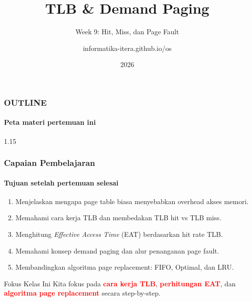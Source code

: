 \documentclass[t,aspectratio=169,xcolor=dvipsnames]{beamer}
\title[TLB \& Demand Paging]{TLB \& Demand Paging}
\subtitle{Week 9: Hit, Miss, dan Page Fault}
\author[informatika-itera.github.io/os]{informatika-itera.github.io/os}
\institute[ITERA]{Program Studi Teknik Informatika \\ Institut Teknologi Sumatera}
\date{\textcolor{nyublue}{2026}}
\newcommand{\tem}[1]{\textbf{\textcolor{red}{#1}}}
\begin{document}
\begin{frame}
    \titlepage
\end{frame}

\begin{frame}
    \frametitle{OUTLINE}
    \framesubtitle{Peta materi pertemuan ini}
    \small
    \begin{spacing}{1.15}
        \tableofcontents
    \end{spacing}
\end{frame}

\begin{frame}
    \frametitle{Capaian Pembelajaran}
    \framesubtitle{Tujuan setelah pertemuan selesai}
    \small
    \begin{enumerate}
        \item Menjelaskan mengapa page table biasa menyebabkan overhead akses memori.
        \item Memahami cara kerja TLB dan membedakan TLB hit vs TLB miss.
        \item Menghitung \textit{Effective Access Time} (EAT) berdasarkan hit rate TLB.
        \item Memahami konsep demand paging dan alur penanganan page fault.
        \item Membandingkan algoritma page replacement: FIFO, Optimal, dan LRU.
    \end{enumerate}
    \begin{exampleblock}{Fokus Kelas Ini}
        Kita fokus pada \tem{cara kerja TLB}, \tem{perhitungan EAT}, dan \tem{algoritma page replacement} secara step-by-step.
    \end{exampleblock}
\end{frame}
\end{document}
